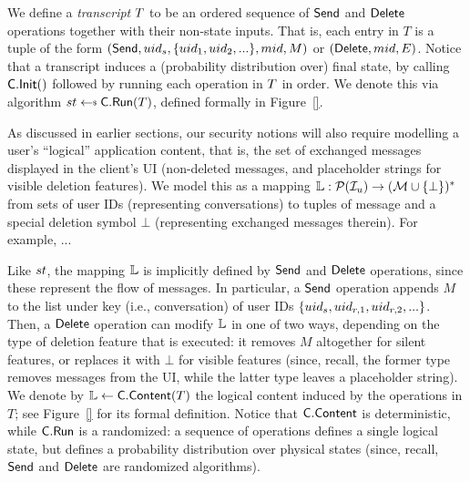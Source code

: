 We define a \emph{transcript} $T$ to be an ordered sequence of $\mathsf{Send}$ and $\mathsf{Delete}$ operations together with their non-state inputs. That is, each entry in $T$ is a tuple of the form $(\mathsf{Send}, uid_s, \{uid_1, uid_2, ...\}, mid, M)$ or $(\mathsf{Delete}, mid, E)$. Notice that a transcript induces a (probability distribution over) final state, by calling $\mathsf{C}.\mathsf{Init}()$ followed by running each operation in $T$ in order. We denote this via algorithm $\appState \getsr \client.\Run(\transcript)$, defined formally in Figure~\ref{}.

As discussed in earlier sections, our security notions will also require modelling a user's ``logical'' application content, that is, the set of exchanged messages displayed in the client's UI (non-deleted messages, and placeholder strings for visible deletion features). We model this as a mapping $\mathbb{L} : \mathcal{P}(\mathcal{I}_u) \to (\mathcal{M} \cup \{\bot\})^*$ from sets of user IDs (representing conversations) to tuples of message and a special deletion symbol $\bot$ (representing exchanged messages therein). For example, ...

Like $st$, the mapping $\mathbb{L}$ is implicitly defined by $\mathsf{Send}$ and $\mathsf{Delete}$ operations, since these represent the flow of messages. In particular, a $\mathsf{Send}$ operation appends $M$ to the list under key (i.e., conversation) of user IDs $\{uid_s, uid_{r, 1}, uid_{r, 2}, ...\}$. Then, a $\mathsf{Delete}$ operation can modify $\mathbb{L}$ in one of two ways, depending on the type of deletion feature that is executed: it removes $M$ altogether for silent features, or replaces it with $\bot$ for visible features (since, recall, the former type removes messages from the UI, while the latter type leaves a placeholder string).
We denote by $\mathbb{L} \gets \mathsf{C}.\mathsf{Content}(T)$ the logical content induced by the operations in $T$; see Figure~\ref{} for its formal definition.
Notice that $\mathsf{C}.\mathsf{Content}$ is deterministic, while $\mathsf{C}.\mathsf{Run}$ is a randomized: a sequence of operations defines a single logical state, but defines a probability distribution over physical states (since, recall, $\mathsf{Send}$ and $\mathsf{Delete}$ are randomized algorithms).

